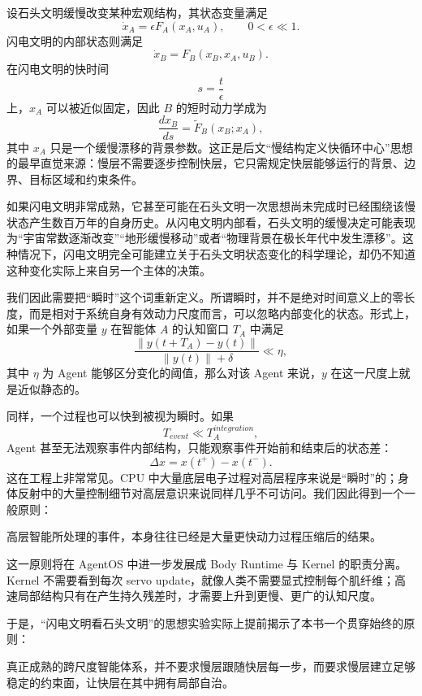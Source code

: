 设石头文明缓慢改变某种宏观结构，其状态变量满足
\[
\dot{x}_A
=
\epsilon F_A(x_A,u_A),
\qquad
0<\epsilon\ll1.
\]
闪电文明的内部状态则满足
\[
\dot{x}_B
=
F_B(x_B,x_A,u_B).
\]
在闪电文明的快时间
\[
s=\frac{t}{\epsilon}
\]
上，$x_A$ 可以被近似固定，因此 $B$ 的短时动力学成为
\[
\frac{dx_B}{ds}
=
\tilde{F}_B(x_B;x_A),
\]
其中 $x_A$ 只是一个缓慢漂移的背景参数。这正是后文“慢结构定义快循环中心”思想的最早直觉来源：慢层不需要逐步控制快层，它只需规定快层能够运行的背景、边界、目标区域和约束条件。

如果闪电文明非常成熟，它甚至可能在石头文明一次思想尚未完成时已经围绕该慢状态产生数百万年的自身历史。从闪电文明内部看，石头文明的缓慢决定可能表现为“宇宙常数逐渐改变”“地形缓慢移动”或者“物理背景在极长年代中发生漂移”。这种情况下，闪电文明完全可能建立关于石头文明状态变化的科学理论，却仍不知道这种变化实际上来自另一个主体的决策。

我们因此需要把“瞬时”这个词重新定义。所谓瞬时，并不是绝对时间意义上的零长度，而是相对于系统自身有效动力尺度而言，可以忽略内部变化的状态。形式上，如果一个外部变量 $y$ 在智能体 $A$ 的认知窗口 $T_A$ 中满足
\[
\frac{
\|y(t+T_A)-y(t)\|
}{
\|y(t)\|+\delta
}
\ll
\eta,
\]
其中 $\eta$ 为 Agent 能够区分变化的阈值，那么对该 Agent 来说，$y$ 在这一尺度上就是近似静态的。

同样，一个过程也可以快到被视为瞬时。如果
\[
T_{event}\ll T_A^{integration},
\]
Agent 甚至无法观察事件内部结构，只能观察事件开始前和结束后的状态差：
\[
\Delta x
=
x(t^+)-x(t^-).
\]
这在工程上非常常见。CPU 中大量底层电子过程对高层程序来说是“瞬时”的；身体反射中的大量控制细节对高层意识来说同样几乎不可访问。我们因此得到一个一般原则：

\begin{proposition*}
高层智能所处理的事件，本身往往已经是大量更快动力过程压缩后的结果。
\end{proposition*}

这一原则将在 AgentOS 中进一步发展成 Body Runtime 与 Kernel 的职责分离。Kernel 不需要看到每次 servo update，就像人类不需要显式控制每个肌纤维；高速局部结构只有在产生持久残差时，才需要上升到更慢、更广的认知尺度。

于是，“闪电文明看石头文明”的思想实验实际上提前揭示了本书一个贯穿始终的原则：

\begin{statementbox}
\centering
{}
\end{statementbox}

真正成熟的跨尺度智能体系，并不要求慢层跟随快层每一步，而要求慢层建立足够稳定的约束面，让快层在其中拥有局部自治。


